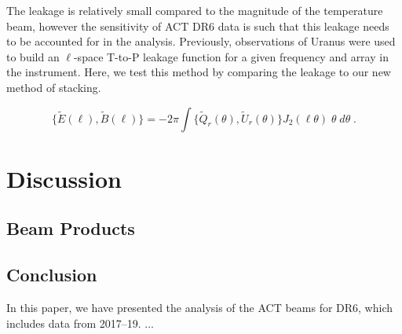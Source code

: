 The leakage is relatively small compared to the magnitude of the temperature beam, however the sensitivity of ACT DR6 data is such that this leakage needs to be accounted for in the analysis.  Previously, observations of Uranus were used to build an $\ell$-space T-to-P leakage function for a given frequency and array in the instrument.  Here, we test this method by comparing the leakage to our new method of stacking.

\begin{equation}
\label{eq:trans_e_b}
    \{\tilde{E}(\ell), \tilde{B}(\ell)\} = -2\pi\int \{\tilde{Q}_r(\theta),\tilde{U}_r(\theta) \} J_2(\ell\theta)\;\theta\;d\theta \; .
\end{equation}


\section{Discussion}
\label{sec:disc}
\subsection{Beam Products}
\label{subsec:prods}
\subsection{Conclusion}
\label{subsec:concl}
In this paper, we have presented the analysis of the ACT beams for DR6, which includes data from 2017--19. ...